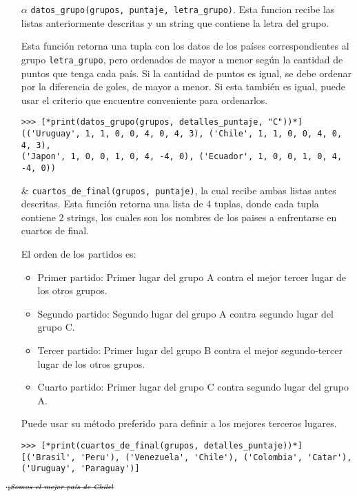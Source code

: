 \begin{enumerate}
    \item[$\alpha$] \texttt{datos\_grupo(grupos, puntaje, letra\_grupo)}. Esta funcion recibe las listas anteriormente descritas y un string que contiene la letra del grupo.
    
    Esta función retorna una tupla con los datos de los países correspondientes al grupo \texttt{letra\_grupo}, pero ordenados de mayor a menor según la cantidad de puntos que tenga cada país. Si la cantidad de puntos es igual, se debe ordenar por la diferencia de goles, de mayor a menor. Si esta también es igual, puede usar el criterio que encuentre conveniente para ordenarlos.
    
\begin{lstlisting}[style=consola]
>>> [*print(datos_grupo(grupos, detalles_puntaje, "C"))*]
(('Uruguay', 1, 1, 0, 0, 4, 0, 4, 3), ('Chile', 1, 1, 0, 0, 4, 0, 4, 3),
('Japon', 1, 0, 0, 1, 0, 4, -4, 0), ('Ecuador', 1, 0, 0, 1, 0, 4, -4, 0))
\end{lstlisting}


    \item[$\&$] \texttt{cuartos\_de\_final(grupos, puntaje)}, la cual recibe ambas listas antes descritas. Esta función retorna una lista de 4 tuplas, donde cada tupla contiene 2 strings, los cuales son los nombres de los paises a enfrentarse en cuartos de final.
    
    El orden de los partidos es:
    \begin{itemize}
        \item Primer partido: Primer lugar del grupo A contra el mejor tercer lugar de los otros grupos.
        \item Segundo partido: Segundo lugar del grupo A contra segundo lugar del grupo C.
        \item Tercer partido: Primer lugar del grupo B contra el mejor segundo-tercer lugar de los otros grupos.
        \item Cuarto partido: Primer lugar del grupo C contra segundo lugar del grupo A.
    \end{itemize}
    
    Puede usar su método preferido para definir a los mejores terceros lugares.

\begin{lstlisting}[style=consola]
>>> [*print(cuartos_de_final(grupos, detalles_puntaje))*]
[('Brasil', 'Peru'), ('Venezuela', 'Chile'), ('Colombia', 'Catar'),
('Uruguay', 'Paraguay')]
\end{lstlisting}

\end{enumerate}

$._\text{\sout{¡\textit{Somos el mejor país de Chile}!}}$
